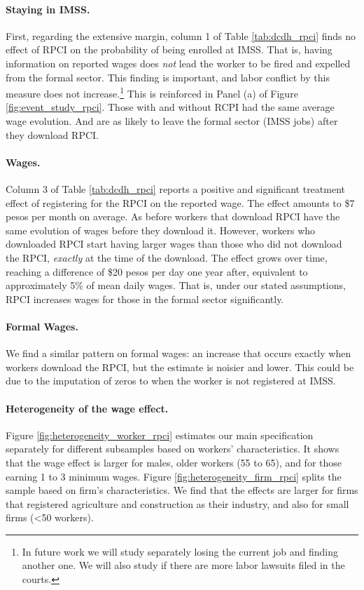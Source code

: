 \documentclass[oneside,11pt]{article}
\begin{document}
\paragraph{Staying in IMSS.} First, regarding the extensive margin, column 1 of Table \ref{tab:dcdh_rpci} finds no effect of RPCI on the probability of being enrolled at IMSS. That is, having information on reported wages does \textit{not} lead the worker to be fired and expelled from the formal sector. This finding is important, and labor conflict by this measure does not increase.\footnote{In future work we will study separately losing the current job and finding another one. We will also study if there are more labor lawsuits filed in the courts.} This is reinforced in Panel (a) of Figure \ref{fig:event_study_rpci}. Those with and without RCPI had the same average wage evolution. And are as likely to leave the formal sector (IMSS jobs) after they download RPCI.

\paragraph{Wages.} Column 3 of Table \ref{tab:dcdh_rpci} reports a positive and significant treatment effect of registering for the RPCI on the reported wage. The effect amounts to \$7 pesos per month on average. As before workers that download RPCI have the same evolution of wages before they download it. However, workers who downloaded RPCI start having larger wages than those who did not download the RPCI, \textit{exactly} at the time of the download. The effect grows over time, reaching a difference of \$20 pesos per day one year after, equivalent to approximately 5\% of mean daily wages. That is, under our stated assumptions, RPCI increases wages for those in the formal sector significantly.

\paragraph{Formal Wages.} We find a similar pattern on formal wages: an increase that occurs exactly when workers download the RPCI, but the estimate is noisier and lower. This could be due to the imputation of zeros to when the worker is not registered at IMSS. 

\paragraph{Heterogeneity of the wage effect.} Figure \ref{fig:heterogeneity_worker_rpci} estimates our main specification separately for different subsamples based on workers' characteristics. It shows that the wage effect is larger for males, older workers (55 to 65), and for those earning 1 to 3 minimum wages. Figure \ref{fig:heterogeneity_firm_rpci} splits the sample based on firm's characteristics. We find that the effects are larger for firms that registered agriculture and construction as their industry, and also for small firms (<50 workers).
\end{document}
